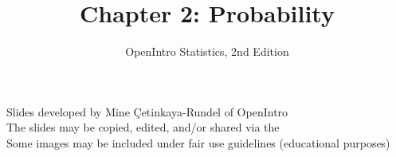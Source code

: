 \documentclass[slidestop,compress,mathserif]{beamer}
\title[Chp 2: Probability]{Chapter 2: Probability}
\author{OpenIntro Statistics, 2nd Edition}
\date{}
\institute{}
\begin{document}


\begin{frame}[plain]

\titlepage

{\footnotesize Slides developed by Mine \c{C}etinkaya-Rundel of OpenIntro \\
The slides may be copied, edited, and/or shared via the  \\
Some images may be included under fair use guidelines (educational purposes)}

\end{frame}








\end{document}
